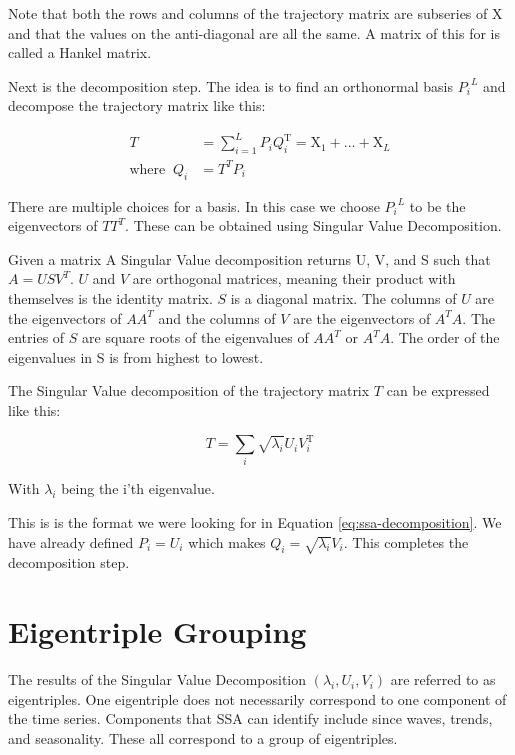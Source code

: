 Note that both the rows and columns of the trajectory matrix are subseries of X and that the values on the anti-diagonal are all the same. A matrix of this for is called a Hankel matrix. 

Next is the decomposition step. The idea is to find an orthonormal basis ${P_i}^L$ and decompose the trajectory matrix like this: 

\begin{equation}
   \begin{aligned}
   T&=\sum_{i=1}^{L} P_{i} Q_{i}^{\mathrm{T}}=\mathrm{X}_{1}+\ldots+\mathrm{X}_{L} \\
   \text{where} \;\; Q_i &= T^TP_i
   \end{aligned}
   \label{eq:ssa-decomposition}
\end{equation}

There are multiple choices for a basis. In this case we choose ${P_i}^L$ to be the eigenvectors of $TT^T$. These can be obtained using Singular Value Decomposition. 

Given a matrix A Singular Value decomposition returns U, V, and S such that $A = USV^T$. $U$ and $V$ are orthogonal matrices, meaning their product with themselves is the identity matrix. $S$ is a diagonal matrix. The columns of $U$ are the eigenvectors of $AA^T$ and the columns of $V$ are the eigenvectors of $A^TA$. The entries of $S$ are square roots of the eigenvalues of $AA^T$ or $A^TA$. The order of the eigenvalues in S is from highest to lowest. 

The Singular Value decomposition of the trajectory matrix $T$ can be expressed like this: 

\begin{equation}
T=\sum_{i} \sqrt{\lambda_{i}} U_{i} V_{i}^{\mathrm{T}}
\end{equation}

With $\lambda_i$ being the i'th eigenvalue.

This is is the format we were looking for in Equation \eqref{eq:ssa-decomposition}. We have already defined $P_i=U_i$ which makes $Q_i = \sqrt{\lambda_i}V_i$. This completes the decomposition step.

\section{Eigentriple Grouping}

The results of the Singular Value Decomposition $(\lambda_i, U_i, V_i)$ are referred to as eigentriples. One eigentriple does not necessarily correspond to one component of the time series. Components that SSA can identify include since waves, trends, and seasonality. These all correspond to a group of eigentriples. 

